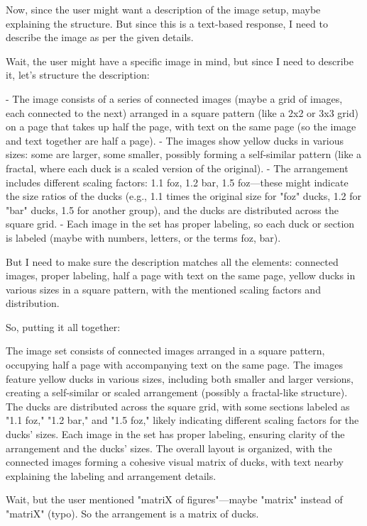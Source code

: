 Now, since the user might want a description of the image setup, maybe explaining the structure. But since this is a text-based response, I need to describe the image as per the given details. 

Wait, the user might have a specific image in mind, but since I need to describe it, let's structure the description:

- The image consists of a series of connected images (maybe a grid of images, each connected to the next) arranged in a square pattern (like a 2x2 or 3x3 grid) on a page that takes up half the page, with text on the same page (so the image and text together are half a page).
- The images show yellow ducks in various sizes: some are larger, some smaller, possibly forming a self-similar pattern (like a fractal, where each duck is a scaled version of the original).
- The arrangement includes different scaling factors: 1.1 foz, 1.2 bar, 1.5 foz—these might indicate the size ratios of the ducks (e.g., 1.1 times the original size for "foz" ducks, 1.2 for "bar" ducks, 1.5 for another group), and the ducks are distributed across the square grid.
- Each image in the set has proper labeling, so each duck or section is labeled (maybe with numbers, letters, or the terms foz, bar).

But I need to make sure the description matches all the elements: connected images, proper labeling, half a page with text on the same page, yellow ducks in various sizes in a square pattern, with the mentioned scaling factors and distribution.

So, putting it all together:

The image set consists of connected images arranged in a square pattern, occupying half a page with accompanying text on the same page. The images feature yellow ducks in various sizes, including both smaller and larger versions, creating a self-similar or scaled arrangement (possibly a fractal-like structure). The ducks are distributed across the square grid, with some sections labeled as "1.1 foz," "1.2 bar," and "1.5 foz," likely indicating different scaling factors for the ducks' sizes. Each image in the set has proper labeling, ensuring clarity of the arrangement and the ducks' sizes. The overall layout is organized, with the connected images forming a cohesive visual matrix of ducks, with text nearby explaining the labeling and arrangement details.

Wait, but the user mentioned "matriX of figures"—maybe "matrix" instead of "matriX" (typo). So the arrangement is a matrix of ducks. 

